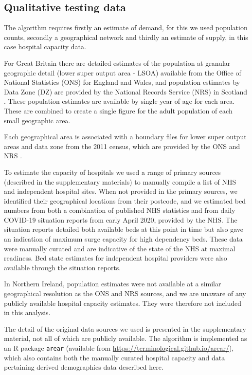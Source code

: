 \documentclass[twocolumn]{bmcart}%
\begin{document}
\subsection*{Qualitative testing data}

The algorithm requires firstly an estimate of demand, for this we used population counts, secondly a geographical 
network and thirdly an estimate of supply, in this case hospital capacity data. 

For Great Britain there are detailed estimates of the population at granular geographic detail (lower super output area 
- LSOA) available from the Office of National Statistics (ONS) for England and Wales, and population estimates by Data 
Zone (DZ) are provided by the National Records Service (NRS) in Scotland 
\cite{PopulationEstimatesOffice,teamNationalRecordsScotland2013}. These population estimates are available by single 
year of age for each area. These are combined to create a single figure for the adult population of each small 
geographic area. 

Each geographical area is associated with a boundary files for lower super output areas and data zone from the 2011 
census, which are provided by the ONS and NRS \cite{OpenGeographyPortal,spatialdata.gov.scotDataZoneBoundaries2020}.

To estimate the capacity of hospitals we used a range of primary sources (described in the supplementary materials) to 
manually compile a list of NHS and independent hospital sites. When not provided in the primary sources, we identified 
their geographical locations from their postcode, and we estimated bed numbers from both a combination of published NHS 
statistics and from daily COVID-19 situation reports from early April 2020, provided by the NHS. The situation reports 
detailed both available beds at this point in time but also gave an indication of maximum surge capacity for high 
dependency beds. These data were manually curated and are indicative of the state of the NHS at maximal readiness. Bed 
state estimates for independent hospital providers were also available through the situation reports.

In Northern Ireland, population estimates were not available at a similar geographical resolution as the ONS and NRS 
sources, and we are unaware of any publicly available hospital capacity estimates. They were therefore not included in 
this analysis.

The detail of the original data sources we used is presented in the supplementary material, not all of which are 
publicly available. The algorithm is implemented as an R package \texttt{arear} (available from
\url{https://terminological.github.io/arear/}), which also contains both the manually curated hospital capacity and 
data pertaining derived demographics data described here. 
\end{document}

